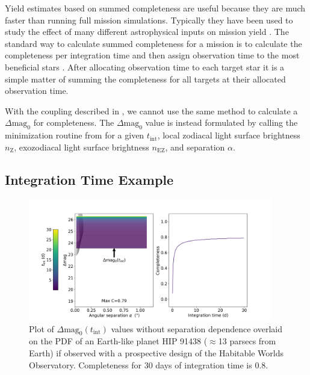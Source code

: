 Yield estimates based on summed completeness are useful because they are much
faster than running full mission simulations. Typically they have been used to
study the effect of many different astrophysical inputs on mission yield
\citep{starkMaximizingExoEarthCandidate2014, Stark2016,
starkExoEarthYieldLandscape2019}. The standard way to calculate summed
completeness for a mission is to calculate the completeness per integration
time and then assign observation time to the most beneficial stars
\citep{hunyadiSingleVisitCompleteness2005,
starkMaximizingExoEarthCandidate2014}. After allocating observation time to
each target star it is a simple matter of summing the completeness for all
targets at their allocated observation time.


With the coupling described in , we cannot use the same
method to calculate a $\Delta\textrm{mag}_0$ for completeness. The
$\Delta\textrm{mag}_0$ value is instead formulated by calling the minimization
routine from  for a given $t_\textrm{int}$, local zodiacal
light surface brightness $n_\textrm{Z}$, exozodiacal light surface brightness
$n_\textrm{EZ}$, and separation $\alpha$.

\subsection{Integration Time Example}
\label{sub:comp_per_inttime}

\begin{figure}
  \begin{center}
    \includegraphics[width=0.95\textwidth]{ch3/figures/default_dmag_curve.png}
  \end{center}
  \caption{Plot of $\Delta\textrm{mag}_0(t_\textrm{int})$ values without separation dependence
  overlaid on the PDF of an Earth-like planet HIP 91438 ($\approx$13 parsecs from Earth)
  if observed with a prospective design of the Habitable Worlds Observatory.
  Completeness for 30 days of integration time is 0.8.}
  \label{fig:default_dmag_curve}
\end{figure}

